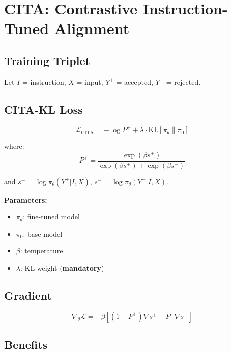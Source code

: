 
\section{CITA: Contrastive Instruction-Tuned Alignment}

\subsection{Training Triplet}

Let $I$ = instruction, $X$ = input, $Y^+$ = accepted, $Y^-$ = rejected.

\subsection{CITA-KL Loss}

\begin{equation}
\mathcal{L}_{\text{CITA}} = -\log P^+ + \lambda \cdot \text{KL}[\pi_\theta \| \pi_0]
\end{equation}

where:
\begin{equation}
P^+ = \frac{\exp(\beta s^+)}{\exp(\beta s^+) + \exp(\beta s^-)}
\end{equation}

and $s^+ = \log \pi_\theta(Y^+ | I, X)$, $s^- = \log \pi_\theta(Y^- | I, X)$.

\textbf{Parameters:}
\begin{itemize}
    \item $\pi_\theta$: fine-tuned model
    \item $\pi_0$: base model
    \item $\beta$: temperature
    \item $\lambda$: KL weight (\textbf{mandatory})
\end{itemize}

\subsection{Gradient}

\begin{equation}
\nabla_\theta \mathcal{L} = -\beta [(1-P^+)\nabla s^+ - P^+\nabla s^-]
\end{equation}

\subsection{Benefits}

